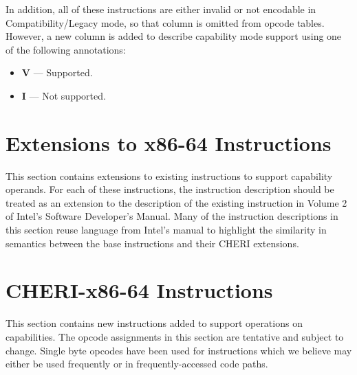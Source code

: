 In addition, all of these instructions are either invalid or not
encodable in Compatibility/Legacy mode, so that column is omitted from
opcode tables.  However, a new column is added to describe capability
mode support using one of the following annotations:

\begin{itemize}
  \item \textbf{V} { }---{ } Supported.
  \item \textbf{I} { }---{ } Not supported.
\end{itemize}

\clearpage
\section{Extensions to x86-64 Instructions}

This section contains extensions to existing instructions to support
capability operands.  For each of these instructions, the instruction
description should be treated as an extension to the description of
the existing instruction in Volume 2 of Intel's Software Developer's
Manual.  Many of the instruction descriptions in this section reuse
language from Intel's manual to highlight the similarity in semantics
between the base instructions and their CHERI extensions.













\clearpage
\section{CHERI-x86-64 Instructions}

This section contains new instructions added to support operations on
capabilities.  The opcode assignments in this section are tentative
and subject to change.  Single byte opcodes have been used for
instructions which we believe may either be used frequently or in
frequently-accessed code paths.















